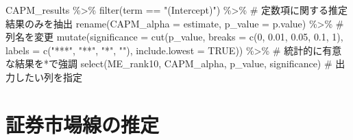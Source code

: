 \documentclass[
  letterpaper,
  DIV=11,
  numbers=noendperiod]{scrreprt}
\newenvironment{Shaded}{\begin{snugshade}}{\end{snugshade}}
\newcommand{\AttributeTok}[1]{\textcolor[rgb]{0.40,0.45,0.13}{#1}}
\newcommand{\CommentTok}[1]{\textcolor[rgb]{0.37,0.37,0.37}{#1}}
\newcommand{\ConstantTok}[1]{\textcolor[rgb]{0.56,0.35,0.01}{#1}}
\newcommand{\DecValTok}[1]{\textcolor[rgb]{0.68,0.00,0.00}{#1}}
\newcommand{\FloatTok}[1]{\textcolor[rgb]{0.68,0.00,0.00}{#1}}
\newcommand{\FunctionTok}[1]{\textcolor[rgb]{0.28,0.35,0.67}{#1}}
\newcommand{\NormalTok}[1]{\textcolor[rgb]{0.00,0.23,0.31}{#1}}
\newcommand{\SpecialCharTok}[1]{\textcolor[rgb]{0.37,0.37,0.37}{#1}}
\newcommand{\StringTok}[1]{\textcolor[rgb]{0.13,0.47,0.30}{#1}}
\begin{document}
\begin{Shaded}
\begin{Highlighting}[]
\NormalTok{CAPM\_results }\SpecialCharTok{\%\textgreater{}\%} 
  \FunctionTok{filter}\NormalTok{(term }\SpecialCharTok{==} \StringTok{"(Intercept)"}\NormalTok{) }\SpecialCharTok{\%\textgreater{}\%} \CommentTok{\# 定数項に関する推定結果のみを抽出}
  \FunctionTok{rename}\NormalTok{(}\AttributeTok{CAPM\_alpha =}\NormalTok{ estimate, }\AttributeTok{p\_value =}\NormalTok{ p.value) }\SpecialCharTok{\%\textgreater{}\%} \CommentTok{\# 列名を変更}
  \FunctionTok{mutate}\NormalTok{(}\AttributeTok{significance =} \FunctionTok{cut}\NormalTok{(p\_value, }
                            \AttributeTok{breaks =} \FunctionTok{c}\NormalTok{(}\DecValTok{0}\NormalTok{, }\FloatTok{0.01}\NormalTok{, }\FloatTok{0.05}\NormalTok{, }\FloatTok{0.1}\NormalTok{, }\DecValTok{1}\NormalTok{), }
                            \AttributeTok{labels =} \FunctionTok{c}\NormalTok{(}\StringTok{"***"}\NormalTok{, }\StringTok{"**"}\NormalTok{, }\StringTok{"*"}\NormalTok{, }\StringTok{""}\NormalTok{), }
                            \AttributeTok{include.lowest =} \ConstantTok{TRUE}\NormalTok{)) }\SpecialCharTok{\%\textgreater{}\%} \CommentTok{\# 統計的に有意な結果を*で強調}
  \FunctionTok{select}\NormalTok{(ME\_rank10, CAPM\_alpha, p\_value, significance) }\CommentTok{\# 出力したい列を指定}
\end{Highlighting}
\end{Shaded}

\section{証券市場線の推定}\label{ux8a3cux5238ux5e02ux5834ux7ddaux306eux63a8ux5b9a}
\end{document}
